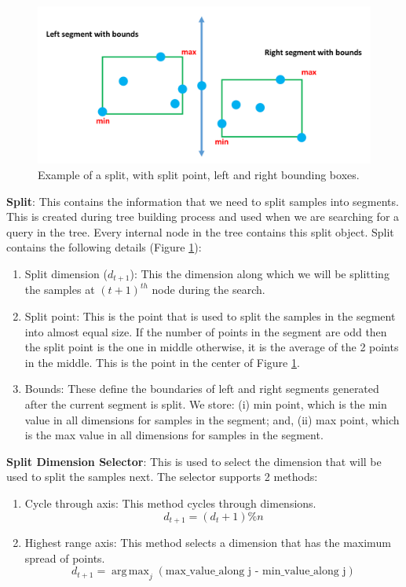 \documentclass[11pt]{amsart}
\begin{document}
\begin{list}{}{\leftmargin= 1.4cm}
\begin{figure}[t!]
\centering
\includegraphics[width=\linewidth]{images/bounding_box}
\caption{Example of a split, with split point, left and right bounding boxes.}
\label{fig:bounding_box}
\end{figure}


\item \textbf{Split}: This contains the information that we need to split samples into segments. This is created during tree building process and used when we are searching for a query in the tree. Every internal node in the tree contains this split object. Split contains the following details (Figure \ref{fig:bounding_box}):
\vspace{1.5 mm}
\begin{enumerate} \setlength\itemsep{0.5em}
\item Split dimension ($d_{t+1}$): This the dimension along which we will be splitting the samples at ${(t+1)}^{th}$ node during the search.
\item Split point: This is the point that is used to split the samples in the segment into almost equal size. If the number of points in the segment are odd then the split point is the one in middle otherwise, it is the average of the 2 points in the middle. This is the point in the center of Figure  \ref{fig:bounding_box}.
\item Bounds:  These define the boundaries of left and right segments generated after the current segment is split. We store: (i) min point, which is the min value in all dimensions for samples in the segment; and, (ii) max point, which is the max value in all dimensions for samples in the segment.
\end{enumerate}
\item \textbf{Split Dimension Selector}: This is used to select the dimension that will be used to split the samples next. The selector supports 2 methods:
\vspace{1.5 mm}
\begin{enumerate}\setlength\itemsep{0.5em}
\item Cycle through axis: This method cycles through dimensions. 
\[ d_{t+1} = (d_{t} + 1)  \% n \]
\item Highest range axis: This method selects a dimension that has the maximum spread of points.
\[ d_{t+1} = \operatorname{arg\,max}_j  (\text{max\_value\_along j - min\_value\_along j})\] 
\end{enumerate}


\end{list}
\end{document}
